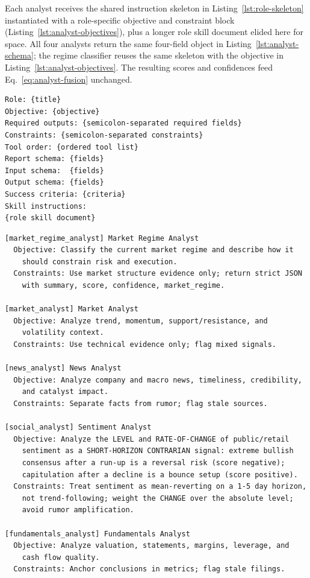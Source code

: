 \documentclass[letterpaper]{article}
\begin{document}
Each analyst receives the shared instruction skeleton in
Listing~\ref{lst:role-skeleton} instantiated with a role-specific objective and
constraint block (Listing~\ref{lst:analyst-objectives}), plus a longer role skill
document elided here for space. All four analysts return the same four-field object
in Listing~\ref{lst:analyst-schema}; the regime classifier reuses the same skeleton
with the objective in Listing~\ref{lst:analyst-objectives}. The resulting scores
and confidences feed Eq.~\ref{eq:analyst-fusion} unchanged.

\begin{listing}[tb]
\caption{Shared role-instruction skeleton assembled by \texttt{build\_role\_instruction}.}
\label{lst:role-skeleton}
\begin{lstlisting}
Role: {title}
Objective: {objective}
Required outputs: {semicolon-separated required fields}
Constraints: {semicolon-separated constraints}
Tool order: {ordered tool list}
Report schema: {fields}
Input schema:  {fields}
Output schema: {fields}
Success criteria: {criteria}
Skill instructions:
{role skill document}
\end{lstlisting}
\end{listing}

\begin{listing}[tb]
\caption{Role objectives and key constraints for the regime classifier and the four
research analysts (verbatim; skill bodies elided).}
\label{lst:analyst-objectives}
\begin{lstlisting}
[market_regime_analyst] Market Regime Analyst
  Objective: Classify the current market regime and describe how it
    should constrain risk and execution.
  Constraints: Use market structure evidence only; return strict JSON
    with summary, score, confidence, market_regime.

[market_analyst] Market Analyst
  Objective: Analyze trend, momentum, support/resistance, and
    volatility context.
  Constraints: Use technical evidence only; flag mixed signals.

[news_analyst] News Analyst
  Objective: Analyze company and macro news, timeliness, credibility,
    and catalyst impact.
  Constraints: Separate facts from rumor; flag stale sources.

[social_analyst] Sentiment Analyst
  Objective: Analyze the LEVEL and RATE-OF-CHANGE of public/retail
    sentiment as a SHORT-HORIZON CONTRARIAN signal: extreme bullish
    consensus after a run-up is a reversal risk (score negative);
    capitulation after a decline is a bounce setup (score positive).
  Constraints: Treat sentiment as mean-reverting on a 1-5 day horizon,
    not trend-following; weight the CHANGE over the absolute level;
    avoid rumor amplification.

[fundamentals_analyst] Fundamentals Analyst
  Objective: Analyze valuation, statements, margins, leverage, and
    cash flow quality.
  Constraints: Anchor conclusions in metrics; flag stale filings.
\end{lstlisting}
\end{listing}
\end{document}
